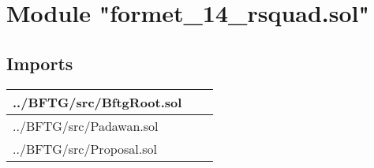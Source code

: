 
\section{Module "formet\_{}14\_{}rsquad.sol"}


\subsection{Imports}


\noindent\begin{tabular}{|l|l|p{5cm}|}\hline
../BFTG/src/BftgRoot.sol &\\\hline
../BFTG/src/Padawan.sol &\\\hline
../BFTG/src/Proposal.sol &\\\hline
\end{tabular}

